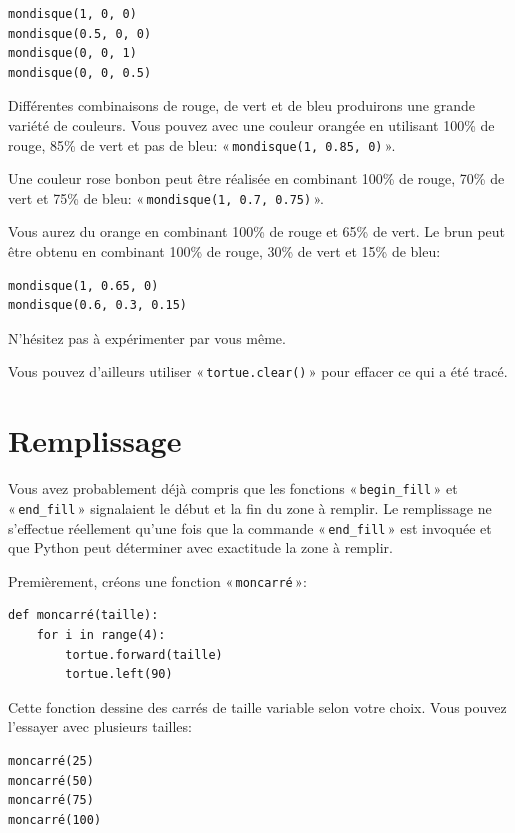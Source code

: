 \begin{Verbatim}[frame=single,rulecolor=\color{mbleu}, label=à taper]
mondisque(1, 0, 0)
mondisque(0.5, 0, 0)
mondisque(0, 0, 1)
mondisque(0, 0, 0.5)
\end{Verbatim}

Différentes combinaisons de rouge, de vert et de bleu produirons une grande variété de couleurs.
Vous pouvez avec une couleur orangée en utilisant 100\% de rouge, 85\% de vert et pas de bleu: « \texttt{mondisque(1, 0.85, 0)} ».

Une couleur rose bonbon peut être réalisée en combinant 100\% de rouge, 70\% de vert et 75\% de bleu: « \texttt{mondisque(1, 0.7, 0.75)} ». 

Vous aurez du orange en combinant 100\% de rouge et 65\% de vert. Le brun peut être obtenu en combinant 100\% de rouge, 30\% de vert et 15\% de bleu:
\begin{Verbatim}[frame=single,rulecolor=\color{mbleu}, label=à taper]
mondisque(1, 0.65, 0)
mondisque(0.6, 0.3, 0.15)
\end{Verbatim}

N'hésitez pas à expérimenter par vous même. 

Vous pouvez d'ailleurs utiliser « \texttt{tortue.clear()} » pour effacer ce qui a été tracé.


\section{Remplissage}
Vous avez probablement déjà compris que les fonctions « \texttt{begin\_fill} » et « \texttt{end\_fill} » signalaient le début et la fin du zone à remplir. Le remplissage ne s'effectue réellement qu'une fois que la commande « \texttt{end\_fill} » est invoquée et que Python peut déterminer avec exactitude la zone à remplir.

Premièrement, créons une fonction « \texttt{moncarré} »:
\begin{Verbatim}[frame=single,rulecolor=\color{mbleu}, label=à taper]
def moncarré(taille):
    for i in range(4):
        tortue.forward(taille)
        tortue.left(90)
\end{Verbatim}

Cette fonction dessine des carrés de taille variable selon votre choix.
Vous pouvez l'essayer avec plusieurs tailles:
\begin{Verbatim}[frame=single,rulecolor=\color{mbleu}, label=à taper]
moncarré(25)
moncarré(50)
moncarré(75)
moncarré(100)
\end{Verbatim}

